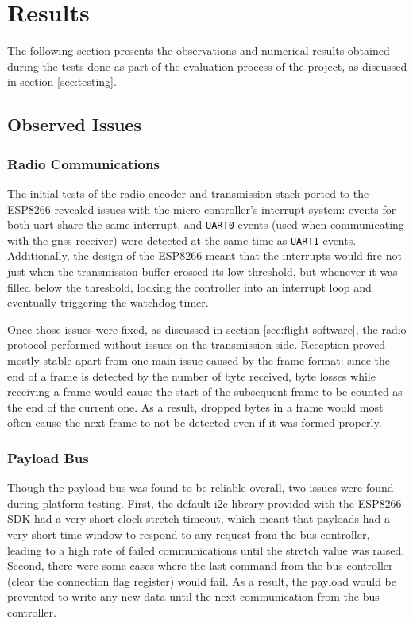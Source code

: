 \chapter{Results}
\label{ch:results}

The following section presents the observations and numerical results obtained
during the tests done as part of the evaluation process of the project, as
discussed in section \ref{sec:testing}.

\section{Observed Issues}

\subsection{Radio Communications}

The initial tests of the radio encoder and transmission stack ported to the
ESP8266 revealed issues with the micro-controller's interrupt system: events for
both \acrshort{uart} share the same interrupt, and \texttt{UART0} events (used
when communicating with the \acrshort{gnss} receiver) were detected at the same
time as \texttt{UART1} events. Additionally, the design of the ESP8266 meant
that the interrupts would fire not just when the transmission buffer crossed
its low threshold, but whenever it was filled below the threshold, locking the
controller into an interrupt loop and eventually triggering the watchdog timer.

Once those issues were fixed, as discussed in section \ref{sec:flight-software},
the radio protocol performed without issues on the transmission side. Reception
proved mostly stable apart from one main issue caused by the frame format: since
the end of a frame is detected by the number of byte received, byte losses
while receiving a frame would cause the start of the subsequent frame to be
counted as the end of the current one. As a result, dropped bytes in a frame
would most often cause the next frame to not be detected even if it was formed
properly.

\subsection{Payload Bus}

Though the payload bus was found to be reliable overall, two issues were found
during platform testing. First, the default \acrshort{i2c} library provided
with the ESP8266 SDK had a very short clock stretch timeout, which meant that
payloads had a very short time window to respond to any request from the bus
controller, leading to a high rate of failed communications until the stretch
value was raised. Second, there were some cases where the last command from the
bus controller (clear the connection flag register) would fail. As a result,
the payload would be prevented to write any new data until the next
communication from the bus controller.

